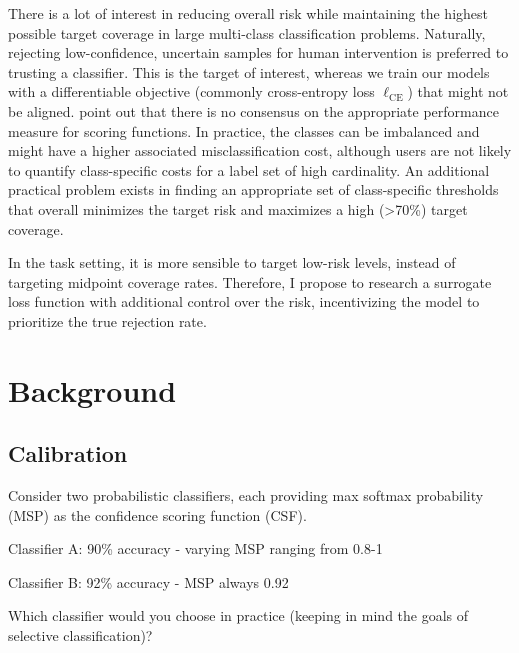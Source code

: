 There is a lot of interest in reducing overall risk while maintaining the highest possible target coverage in large multi-class classification problems. Naturally, rejecting low-confidence, uncertain samples for human intervention is preferred to trusting a classifier. 
This is the target of interest, whereas we train our models with a differentiable objective (commonly cross-entropy loss $\ell_{\mathrm{CE}}$) that might not be aligned. \cite{geifman2017selective,geifman2018bias} point out that there is no consensus on the appropriate performance measure for scoring functions.
In practice, the classes can be imbalanced and might have a higher associated misclassification cost, although users are not likely to quantify class-specific costs for a label set of high cardinality. %
An additional practical problem exists in finding an appropriate set of class-specific thresholds that overall minimizes the target risk and maximizes a high (>70\%) target coverage. 

In the \DC{} task setting, it is more sensible to target low-risk levels, instead of targeting midpoint coverage rates. Therefore, I propose to research a surrogate loss function with additional control over the risk, incentivizing the model to prioritize the true rejection rate. 


\section{Background}

\subsection{Calibration}



\noindent \begin{uuyellowbox}[title=Top-1 calibration does not imply good failure prediction \cite{zhu2022rethinking}]

    Consider two probabilistic classifiers, each providing max softmax probability (MSP) as the confidence scoring function (CSF).\newline

    Classifier A: 90\% accuracy - varying MSP ranging from 0.8-1
    
    Classifier B: 92\% accuracy - MSP always 0.92\newline

    Which classifier would you choose in practice (keeping in mind the goals of selective classification)?
    
\end{uuyellowbox}



